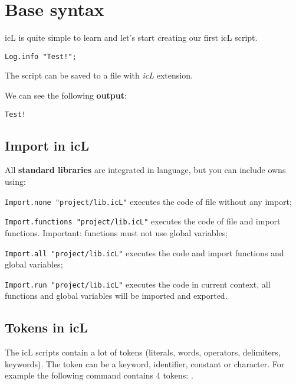 

\section{Base syntax}

icL is quite simple to learn and let's start creating our first icL script.
\begin{verbatim}
Log.info "Test!";
\end{verbatim}

The script can be saved to a file with \textit{icL} extension.

We can see the following \textbf{output}:

\begin{verbatim}
Test!
\end{verbatim}

\subsection{Import in icL}

All \textbf{standard libraries} are integrated in language, but you can include owns using:

\begin{icItems}
\item
	\texttt{Import.none "project/lib.icL"} executes the code of file without any import;
\item
	\texttt{Import.functions "project/lib.icL"} executes the code of file and import functions. {\color{red}Important:} functions must not use global variables;
\item
	\texttt{Import.all "project/lib.icL"} executes the code and import functions and global variables;
\item
	\texttt{Import.run "project/lib.icL"} executes the code in current context, all functions and global variables will be imported and exported.
\end{icItems}

\subsection{Tokens in icL}

The icL scripts contain a lot of tokens (literals, words, operators, delimiters, keywords). The token can be a keyword, identifier, constant or character. For example the following command contains 4 tokens: .

